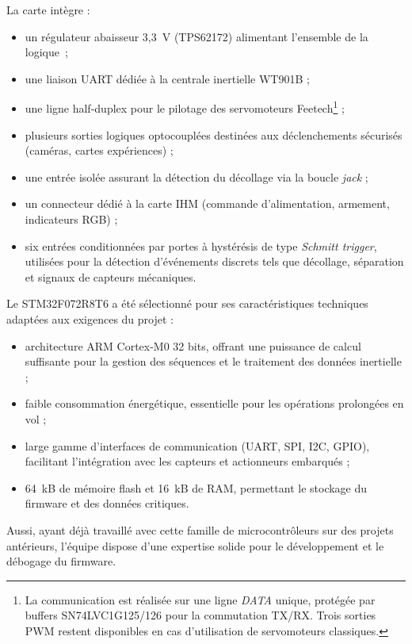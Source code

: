 La carte intègre :
\begin{itemize}
    \item un régulateur abaisseur 3,3~V (TPS62172) alimentant l’ensemble de la logique~;
    \item une liaison UART dédiée à la centrale inertielle WT901B ;
    \item une ligne half-duplex pour le pilotage des servomoteurs Feetech\footnote{La communication est réalisée sur une ligne
    \textit{DATA} unique, protégée par buffers SN74LVC1G125/126 pour la commutation TX/RX. Trois sorties PWM restent
    disponibles en cas d’utilisation de servomoteurs classiques.} ;
    \item plusieurs sorties logiques optocouplées destinées aux déclenchements sécurisés (caméras, cartes expériences) ;
    \item une entrée isolée assurant la détection du décollage via la boucle \textit{jack} ;
    \item un connecteur dédié à la carte IHM (commande d’alimentation, armement, indicateurs RGB) ;
    \item six entrées conditionnées par portes à hystérésis de type \textit{Schmitt trigger}, utilisées pour la détection
    d’événements discrets tels que décollage, séparation et signaux de capteurs mécaniques.
\end{itemize}

Le STM32F072R8T6 a été sélectionné pour ses caractéristiques techniques adaptées aux exigences du projet :
\begin{itemize}
    \item architecture ARM Cortex-M0 32 bits, offrant une puissance de calcul suffisante pour la gestion des séquences et
    le traitement des données inertielle ;
    \item faible consommation énergétique, essentielle pour les opérations prolongées en vol ;
    \item large gamme d’interfaces de communication (UART, SPI, I2C, GPIO), facilitant l’intégration avec les capteurs et
    actionneurs embarqués ;
    \item 64~kB de mémoire flash et 16~kB de RAM, permettant le stockage du firmware et des données critiques. \\
\end{itemize}

Aussi, ayant déjà travaillé avec cette famille de microcontrôleurs sur des projets antérieurs, l’équipe dispose d’une expertise
solide pour le développement et le débogage du firmware.


